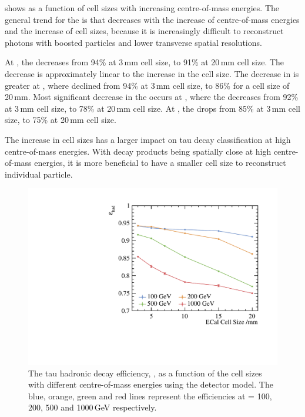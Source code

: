  shows \tauHad as a function of \ECAL cell sizes with increasing centre-of-mass energies. The general trend for the \tauHad is that \tauHad decreases with the increase of centre-of-mass energies and the increase of \ECAL cell sizes, because it is increasingly difficult to reconstruct photons with boosted particles and lower \ECAL transverse spatial resolutions.


At , the \tauHad decreases from 94\% at 3\,mm cell size, to 91\% at 20\,mm cell size. The decrease is approximately linear to the increase in the cell size. The decrease in \tauHad is greater at , where \tauHad declined from 94\% at 3\,mm cell size, to 86\% for a \ECAL cell size of  20\,mm. Most significant decrease in the \tauHad occurs at  , where the \tauHad decreases from 92\% at 3\,mm cell size, to 78\% at 20\,mm cell size. At , the \tauHad drops from 85\% at 3\,mm cell size, to 75\% at 20\,mm cell size.


The increase in \ECAL cell sizes has a larger impact on tau decay classification at high centre-of-mass energies. With decay products being spatially close at high centre-of-mass energies, it is more beneficial to have a smaller \ECAL cell size to reconstruct individual particle.

\begin{figure}[htbp]
\centering %
\includegraphics[width=.85\textwidth]{tau/plots3/hadronicEff.pdf}
\caption[The tau hadronic decay efficiency as a function of  the \ECAL cell sizes at different \sqrtS with the \ILD detector model.]
{The tau hadronic decay efficiency, \tauHad, as a function of  the \ECAL cell sizes with different centre-of-mass energies using the \ILD detector model. The blue, orange, green and red lines  represent the efficiencies at \sqrtS = 100, 200, 500 and 1000\,GeV respectively.}
\label{fig:TauHadronicEfficiency}
\end{figure}


